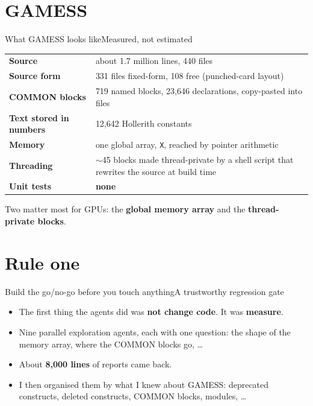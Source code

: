 \documentclass[aspectratio=169]{beamer}
\newcommand{\cplx}[1]{{\footnotesize\color{cookieMuted}#1}}
\begin{document}
\section{GAMESS}

\begin{frame}{What GAMESS looks like}{Measured, not estimated}
  \small
  \renewcommand{\arraystretch}{1.15}
  \begin{tabularx}{\textwidth}{@{}l X@{}}
    \toprule
    \textbf{Source} & about 1.7 million lines, 440 files \\
    \textbf{Source form} & 331 files fixed-form, 108 free \cplx{(punched-card layout)} \\
    \textbf{COMMON blocks} & 719 named blocks, 23,646 declarations, copy-pasted into files \\
    \textbf{Text stored in numbers} & 12,642 Hollerith constants \\
    \textbf{Memory} & one global array, \texttt{X}, reached by pointer arithmetic \\
    \textbf{Threading} & $\sim$45 blocks made thread-private by a shell script that rewrites the source at build time \\
    \textbf{Unit tests} & \textbf{none} \\
    \bottomrule
  \end{tabularx}
  \vspace{.5em}

  Two matter most for GPUs: the \textbf{global memory array} and the \textbf{thread-private blocks}.
\end{frame}

\section{Rule one}

\begin{frame}{Build the go/no-go before you touch anything}{A trustworthy regression gate}
  \begin{itemize}\setlength\itemsep{6pt}
    \item The first thing the agents did was \textbf{not change code}. It was \textbf{measure}.
    \item Nine parallel exploration agents, each with one question: the shape of the memory array, where the COMMON blocks go, \dots
    \item About \textbf{8,000 lines} of reports came back.
    \item I then organised them by what I knew about GAMESS: deprecated constructs, deleted constructs, COMMON blocks, modules, \dots
  \end{itemize}
\end{frame}
\end{document}
